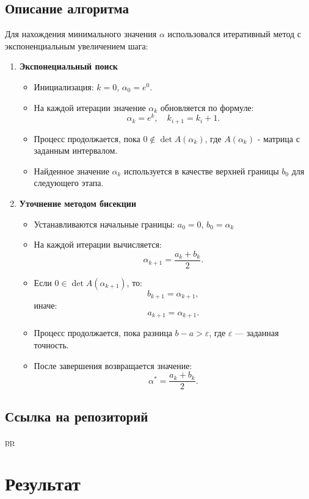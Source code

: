 \documentclass[a4paper,14pt]{article}
\begin{document}
	\subsection{Описание алгоритма}
	Для нахождения минимального значения \(\alpha\) использовался итеративный метод с экспоненциальным увеличением шага:
	\begin{enumerate}
		\item \textbf{Экспонециальный поиск}
		\begin{itemize}
			\item Инициализация: \( k = 0 \), \(\alpha_0 = e^0\).
			\item На каждой итерации значение \( \alpha_k \) обновляется по формуле:
          		\[ \alpha_k = e^k, \quad k_{i+1} = k_{i} + 1. \]
				  \item Процесс продолжается, пока \( 0 \notin \det A(\alpha_k) \), где \( A(\alpha_k) \) - матрица с заданным интервалом.
				  \item Найденное значение \( \alpha_k \) используется в качестве верхней границы \( b_0 \) для следующего этапа.
		\end{itemize}
		\item \textbf{Уточнение методом бисекции}
		\begin{itemize}
			\item Устанавливаются начальные границы: \( a_0 = 0 \), \( b_0 = \alpha_k \)
			\item На каждой итерации вычисляется:
				\[ \alpha_{k+1} = \frac{a_k + b_k}{2}. \]
			\item Если \( 0 \in \det A(\alpha_{k+1}) \), то:
				\[ b_{k+1} = \alpha_{k+1}, \]
			иначе:
				\[ a_{k+1} = \alpha_{k+1}. \]
			\item Процесс продолжается, пока разница \( b - a > \varepsilon \), где \( \varepsilon \) — заданная точность.
			\item После завершения возвращается значение:
				  \[ \alpha^* = \frac{a_k + b_k}{2}. \]	
		\end{itemize}
	\end{enumerate}
	
	\subsection{Ссылка на репозиторий}
	\url{pp} 
	
	\clearpage

	\section{Результат}
\end{document}

